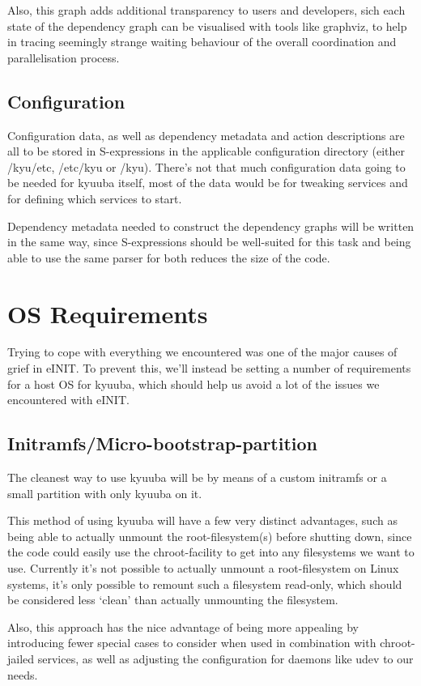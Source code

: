 \documentclass[a4paper,twoside,titlepage]{article}
\begin{document}
Also, this graph adds additional transparency to users and developers, sich each
state of the dependency graph can be visualised with tools like graphviz, to
help in tracing seemingly strange waiting behaviour of the overall coordination
and parallelisation process.

\subsection{Configuration}
Configuration data, as well as dependency metadata and action descriptions are
all to be stored in S-expressions in the applicable configuration directory
(either /kyu/etc, /etc/kyu or /kyu). There's not that much configuration data
going to be needed for kyuuba itself, most of the data would be for tweaking
services and for defining which services to start.

Dependency metadata needed to construct the dependency graphs will be written in
the same way, since S-expressions should be well-suited for this task and being
able to use the same parser for both reduces the size of the code.

\section{OS Requirements}
Trying to cope with everything we encountered was one of the major causes of
grief in eINIT. To prevent this, we'll instead be setting a number of
requirements for a host OS for kyuuba, which should help us avoid a lot of the
issues we encountered with eINIT.

\subsection{Initramfs/Micro-bootstrap-partition}
The cleanest way to use kyuuba will be by means of a custom initramfs or a small
partition with only kyuuba on it.

This method of using kyuuba will have a few very distinct advantages, such as
being able to actually unmount the root-filesystem(s) before shutting down,
since the code could easily use the chroot-facility to get into any filesystems
we want to use. Currently it's not possible to actually unmount a
root-filesystem on Linux systems, it's only possible to remount such a
filesystem read-only, which should be considered less `clean' than actually
unmounting the filesystem.

Also, this approach has the nice advantage of being more appealing by
introducing fewer special cases to consider when used in combination with
chroot-jailed services, as well as adjusting the configuration for daemons like
udev to our needs.
\end{document}
